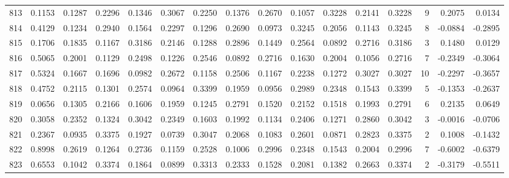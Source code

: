 \begin{tabular}{lrrrrrrrrrrrrrrr}
813 &      0.1153 &  0.1287 &  0.2296 &  0.1346 &  0.3067 &  0.2250 &  0.1376 &  0.2670 &  0.1057 &  0.3228 &   0.2141 &     0.3228 &      9 &                    0.2075 &                     0.0134 \\
814 &      0.4129 &  0.1234 &  0.2940 &  0.1564 &  0.2297 &  0.1296 &  0.2690 &  0.0973 &  0.3245 &  0.2056 &   0.1143 &     0.3245 &      8 &                   -0.0884 &                    -0.2895 \\
815 &      0.1706 &  0.1835 &  0.1167 &  0.3186 &  0.2146 &  0.1288 &  0.2896 &  0.1449 &  0.2564 &  0.0892 &   0.2716 &     0.3186 &      3 &                    0.1480 &                     0.0129 \\
816 &      0.5065 &  0.2001 &  0.1129 &  0.2498 &  0.1226 &  0.2546 &  0.0892 &  0.2716 &  0.1630 &  0.2004 &   0.1056 &     0.2716 &      7 &                   -0.2349 &                    -0.3064 \\
817 &      0.5324 &  0.1667 &  0.1696 &  0.0982 &  0.2672 &  0.1158 &  0.2506 &  0.1167 &  0.2238 &  0.1272 &   0.3027 &     0.3027 &     10 &                   -0.2297 &                    -0.3657 \\
818 &      0.4752 &  0.2115 &  0.1301 &  0.2574 &  0.0964 &  0.3399 &  0.1959 &  0.0956 &  0.2989 &  0.2348 &   0.1543 &     0.3399 &      5 &                   -0.1353 &                    -0.2637 \\
819 &      0.0656 &  0.1305 &  0.2166 &  0.1606 &  0.1959 &  0.1245 &  0.2791 &  0.1520 &  0.2152 &  0.1518 &   0.1993 &     0.2791 &      6 &                    0.2135 &                     0.0649 \\
820 &      0.3058 &  0.2352 &  0.1324 &  0.3042 &  0.2349 &  0.1603 &  0.1992 &  0.1134 &  0.2406 &  0.1271 &   0.2860 &     0.3042 &      3 &                   -0.0016 &                    -0.0706 \\
821 &      0.2367 &  0.0935 &  0.3375 &  0.1927 &  0.0739 &  0.3047 &  0.2068 &  0.1083 &  0.2601 &  0.0871 &   0.2823 &     0.3375 &      2 &                    0.1008 &                    -0.1432 \\
822 &      0.8998 &  0.2619 &  0.1264 &  0.2736 &  0.1159 &  0.2528 &  0.1006 &  0.2996 &  0.2348 &  0.1543 &   0.2004 &     0.2996 &      7 &                   -0.6002 &                    -0.6379 \\
823 &      0.6553 &  0.1042 &  0.3374 &  0.1864 &  0.0899 &  0.3313 &  0.2333 &  0.1528 &  0.2081 &  0.1382 &   0.2663 &     0.3374 &      2 &                   -0.3179 &                    -0.5511 \\

\end{tabular}
